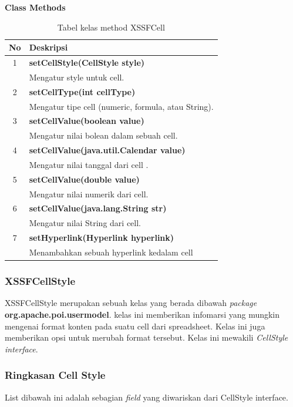 \noindent \textbf{Class Methods}
\begin{table}[H]
		\centering
		\caption{Tabel kelas method XSSFCell}
		\label{tab:methodXSSFCell}
	\begin{tabular}{|c|p{12cm}|}
		\hline
		\textbf{No} & \textbf{Deskripsi} \\ \hline \hline
		1 & \textbf{setCellStyle(CellStyle style)}\\
			&	Mengatur style untuk cell.\\ \hline 
		2 & \textbf{setCellType(int cellType)}\\
			&	Mengatur tipe cell (numeric, formula, atau String).\\ \hline
		3 & \textbf{setCellValue(boolean value)}\\
			&	Mengatur nilai bolean dalam sebuah cell.\\ \hline
		4 & \textbf{setCellValue(java.util.Calendar value)}\\
			&	Mengatur nilai tanggal dari cell .\\ \hline	
		5 & \textbf{setCellValue(double value)}\\
			&	Mengatur nilai numerik dari cell.\\ \hline
		6 & \textbf{setCellValue(java.lang.String str)}\\
			&	Mengatur nilai String dari cell.\\ \hline
		7 & \textbf{setHyperlink(Hyperlink hyperlink)}\\
			&	Menambahkan sebuah hyperlink kedalam cell\\ \hline					
	\end{tabular}
\end{table}

\subsubsection{XSSFCellStyle}
\label{subs:XSSFCellStyle}
XSSFCellStyle merupakan sebuah kelas yang berada dibawah \textit{package} \textbf{org.apache.poi.usermodel}. kelas ini memberikan infomarsi yang mungkin mengenai format konten pada suatu cell dari spreadsheet. Kelas ini juga memberikan opsi untuk merubah format tersebut. Kelas ini mewakili \textit{CellStyle interface}.\cite{apachepoi2}

\subsubsection{Ringkasan Cell Style}
\label{subs:Ringkasan_Cell_Style}
List dibawah ini adalah sebagian \textit{field} yang diwariskan dari CellStyle interface.\cite{apachepoi2}\\

